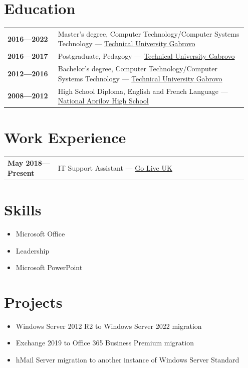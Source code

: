 \documentclass[letterpaper,10pt]{article}
\begin{document}
	\hfill
	\begin{minipage}[t]{0.5\textwidth}
		\section*{Education}
		\begin{tabular}{@{}p{0.2\linewidth} p{0.75\linewidth}}
			\textbf{2016—2022} & Master's degree, Computer Technology/Computer Systems Technology — \href{https://www.tugab.bg/en/}{Technical University Gabrovo} \\
			\textbf{2016—2017} & Postgraduate, Pedagogy — \href{https://www.tugab.bg/en/}{Technical University Gabrovo} \\
			\textbf{2012—2016} & Bachelor's degree, Computer Technology/Computer Systems Technology — \href{https://www.tugab.bg/en/}{Technical University Gabrovo} \\
			\textbf{2008—2012} & High School Diploma, English and French Language — \href{https://nag-school.org/}{National Aprilov High School} \\
		\end{tabular}
		
		\section*{Work Experience}
		\begin{tabular}{@{}p{0.2\linewidth} p{0.75\linewidth}}
			\textbf{May 2018—Present} & IT Support Assistant — \href{https://www.goliveuk.com/}{Go Live UK} \\
		\end{tabular}
		
		\section*{Skills}
		\begin{itemize}
			\item {Microsoft Office}
			\item {Leadership}
			\item {Microsoft PowerPoint}
		\end{itemize}
		
		\section*{Projects}
		\begin{itemize}
			\item Windows Server 2012 R2 to Windows Server 2022 migration
			\item Exchange 2019 to Office 365 Business Premium migration
			\item hMail Server migration to another instance of
			Windows Server Standard
		\end{itemize}
		

\end{minipage}
\end{document}
